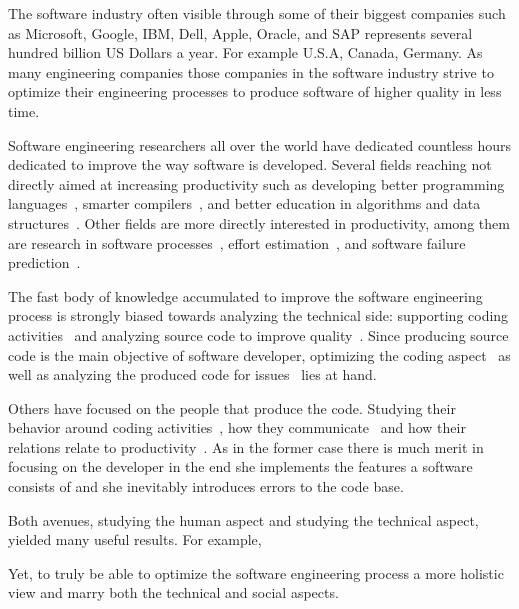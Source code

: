 The software industry often visible through some of their biggest companies such as Microsoft, Google, IBM, Dell, Apple, Oracle, and SAP represents several hundred billion US Dollars a year. 
For example  U.S.A, Canada, Germany.
As many engineering companies those companies in the software industry strive to optimize their engineering processes to produce software of higher quality in less time.

Software engineering researchers all over the world have dedicated countless hours dedicated to improve the way software is developed.
Several fields reaching not directly aimed at increasing productivity such as developing better programming languages~\cite{}, smarter compilers~\cite{}, and better education in algorithms and data structures~\cite{}.
Other fields are more directly interested in productivity, among them are research in software processes~\cite{}, effort estimation~\cite{}, and software failure prediction~\cite{}.

The fast body of knowledge accumulated to improve the software engineering process is strongly biased towards analyzing the technical side: supporting coding activities~\cite{} and analyzing source code to improve quality~\cite{}. 
Since producing source code is the main objective of software developer, optimizing the coding aspect~\cite{} as well as analyzing the produced code for issues~\cite{} lies at hand.

Others have focused on the people that produce the code. Studying their behavior around coding activities~\cite{}, how they communicate~\cite{} and how their relations relate to productivity~\cite{}.
As in the former case there is much merit in focusing on the developer in the end she implements the features a software consists of and she inevitably introduces errors to the code base.

Both avenues, studying the human aspect and studying the technical aspect, yielded many useful results.
For example,  

Yet, to truly be able to optimize the software engineering process a more holistic view and marry both the technical and social aspects.






